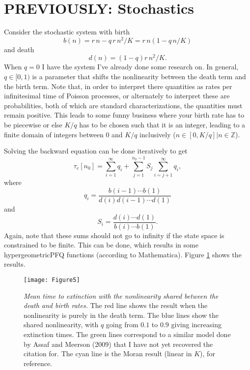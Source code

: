 \documentclass[a4paper,10pt]{article}
\numberwithin{equation}{section} %
\begin{document}
\section{PREVIOUSLY: Stochastics}
Consider the stochastic system with birth
\begin{equation}
 b(n) = r\,n - q\,r\,n^2/K = r\,n\left(1-q\,n/K\right)
\end{equation}
and death
\begin{equation}
 d(n) = (1-q)r\,n^2/K.
\end{equation}
When $q=0$ I have the system I've already done some research on.  
In general, $q\in[0,1)$ is a parameter that shifts the nonlinearity between the death term and the birth term.  
Note that, in order to interpret there quantities as rates per infinitesimal time of Poisson processes, or alternately to interpret these are probabilities, both of which are standard characterizations, the quantities must remain positive.  
This leads to some funny business where your birth rate has to be piecewise or else $K/q$ has to be chosen such that it is an integer, leading to a finite domain of integers between $0$ and $K/q$ inclusively ($n\in[0,K/q]|n\in\mathbb{Z}$).  

Solving the backward equation can be done iteratively to get
\begin{equation} \label{etime-approx0}
 \tau_e[n_0] = \sum_{i=1}^{\infty}q_i + \sum_{j=1}^{n_0-1} S_j\sum_{i=j+1}^{\infty}q_i,
\end{equation}
where
\begin{equation}
 q_i = \frac{b(i-1)\cdots b(1)}{d(i)d(i-1)\cdots d(1)}
\end{equation}
and
\begin{equation}
 S_i = \frac{d(i)\cdots d(1)}{b(i)\cdots b(1)}.  
\end{equation}
Again, note that these sums should not go to infinity if the state space is constrained to be finite.  
This can be done, which results in some hypergeometricPFQ functions (according to Mathematica).  
Figure \ref{tauvK} shows the results.  

\begin{figure}[ht]
\centering
\texttt{[image: Figure5]}
\caption{\emph{Mean time to extinction with the nonlinearity shared between the death and birth rates.}  The red line shows the result when the nonlinearity is purely in the death term.  The blue lines show the shared nonlinearity, with $q$ going from $0.1$ to $0.9$ giving increasing extinction times.  The green lines correspond to a similar model done by Assaf and Meerson (2009) that I have not yet recovered the citation for.  The cyan line is the Moran result (linear in $K$), for reference.  } \label{tauvK}
\end{figure}
\end{document}

